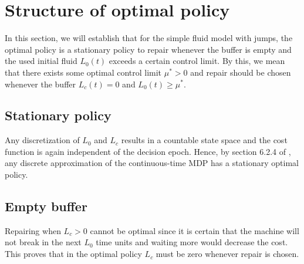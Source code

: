 \section{Structure of optimal policy}
In this section, we will establish that for the simple fluid model with jumps, the optimal policy is a stationary policy to repair whenever the buffer is empty and the used initial fluid $L_0(t)$ exceeds a certain control limit.
By this, we mean that there exists some optimal control limit $\mu^*>0$ and repair should be chosen whenever the buffer $L_c(t)=0$ and $L_0(t)\geq\mu^*$.

\subsection{Stationary policy}
Any discretization of $L_0$ and $L_c$ results in a countable state space and the cost function is again independent of the decision epoch.
Hence, by section 6.2.4 of \cite{Puterman2008}, any discrete approximation of the continuous-time MDP has a stationary optimal policy.

\subsection{Empty buffer}
Repairing when $L_c>0$ cannot be optimal since it is certain that the machine will not break in the next $L_0$ time units and waiting more would decrease the cost.
This proves that in the optimal policy $L_c$ must be zero whenever repair is chosen.


